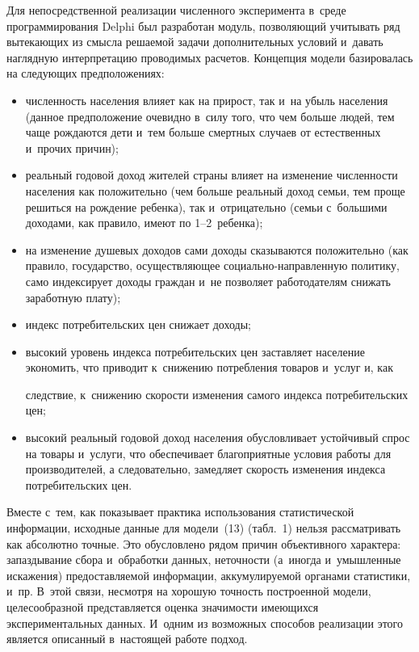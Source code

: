 \begin{multicols}{2}
  Для непосредственной реализации численного эксперимента в~среде
программирования Delphi был разработан модуль, позволяющий учитывать ряд
вытекающих из смысла решаемой задачи дополнительных условий и~давать
наглядную интерпретацию проводимых расчетов. Концепция модели
базировалась на следующих предположениях:
  \begin{itemize}
\item численность населения влияет как на прирост, так и~на убыль населения
(данное предположение очевидно в~силу того, что чем больше людей, тем чаще
рождаются дети и~тем больше смертных случаев от естественных и~прочих
причин);
\item реальный годовой доход жителей страны влияет на изменение
численности населения как положительно (чем больше реальный доход семьи,
тем проще решиться на рождение ребенка), так и~отрицательно (семьи с~большими доходами, как правило, имеют по 1--2~ребенка);
\item на изменение душевых доходов сами доходы сказываются положительно
(как правило, государство, осуществляющее со\-ци\-аль\-но-на\-прав\-лен\-ную
политику, само индексирует доходы граждан и~не позволяет работодателям
снижать заработную плату);
\item индекс потребительских цен снижает доходы;
\item высокий уровень индекса потребительских цен заставляет население
экономить, что приводит
 к~снижению потребления товаров и~услуг и, как\linebreak\vspace*{-12pt}

\pagebreak



\pagebreak

\noindent
следствие, к~снижению скорости изменения самого индекса потребительских
цен;
\item высокий реальный годовой доход населения обусловливает устойчивый
спрос на товары и~услуги, что обеспечивает благоприятные условия работы для
производителей, а следовательно, замедляет скорость изменения индекса
потребительских цен.
\end{itemize}

  Вместе с~тем, как показывает практика использования статистической
информации, исходные данные для модели~(13) (табл.~1) нельзя рассматривать
как абсолютно точные. Это обусловлено рядом причин объективного
характера: запаздывание сбора и~обработки данных, неточности (а~иногда и~умышленные искажения) предоставляемой информации, аккумулируемой
органами статистики, и~пр. В~этой связи, несмотря на хорошую точность
построенной модели, целесообразной представляется оценка значимости
имеющихся экспериментальных данных. И~одним из возможных способов
реализации этого является описанный в~настоящей работе подход.


\end{multicols}

